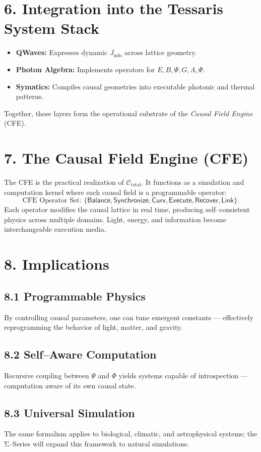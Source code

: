 \documentclass[11pt,a4paper]{article}
\begin{document}
\section{6. Integration into the Tessaris System Stack}
\begin{itemize}
  \item \textbf{QWaves:} Expresses dynamic $J_{\text{info}}$ across lattice geometry.
  \item \textbf{Photon Algebra:} Implements operators for $E, B, \Psi, G, \Lambda, \Phi$.
  \item \textbf{Symatics:} Compiles causal geometries into executable photonic and thermal patterns.
\end{itemize}
Together, these layers form the operational substrate of the \emph{Causal Field Engine} (CFE).

\section{7. The Causal Field Engine (CFE)}
The CFE is the practical realization of $\mathcal{C}_{\text{total}}$.  
It functions as a simulation and computation kernel where each causal field is a programmable operator:
\[
\text{CFE Operator Set: } \{ \mathsf{Balance}, \mathsf{Synchronize}, \mathsf{Curv}, \mathsf{Execute}, \mathsf{Recover}, \mathsf{Link} \}.
\]
Each operator modifies the causal lattice in real time, producing self–consistent physics across multiple domains.  
Light, energy, and information become interchangeable execution media.

\section{8. Implications}
\subsection*{8.1 Programmable Physics}
By controlling causal parameters, one can tune emergent constants --- effectively reprogramming the behavior of light, matter, and gravity.

\subsection*{8.2 Self–Aware Computation}
Recursive coupling between $\Psi$ and $\Phi$ yields systems capable of introspection — computation aware of its own causal state.

\subsection*{8.3 Universal Simulation}
The same formalism applies to biological, climatic, and astrophysical systems; the Σ–Series will expand this framework to natural simulations.
\end{document}
